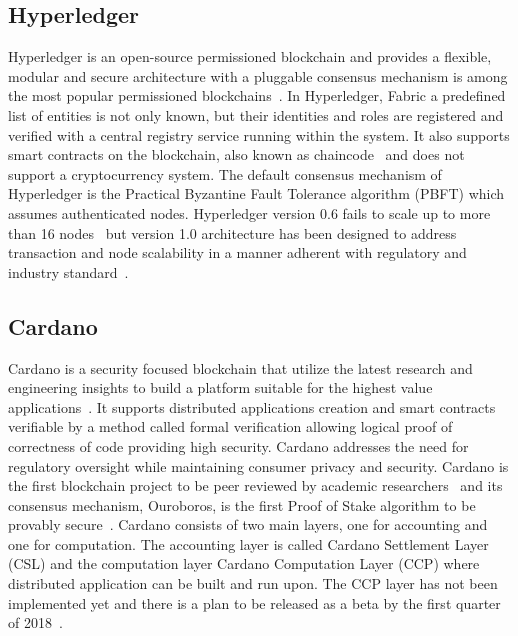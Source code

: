 \subsection{Hyperledger}\label{bltech:impl:hyperledger}

Hyperledger is an open-source permissioned blockchain and provides a flexible, modular and secure architecture with a
pluggable consensus mechanism is among the most popular permissioned blockchains~\cite{DBLP:journals/corr/abs-1708-05665}. In Hyperledger, Fabric a predefined list of
entities is not only known, but their identities and roles are registered and verified with a central registry service running within the system.
It also supports smart contracts on the blockchain, also known as chaincode~\cite{bl_consensus} and does not support a cryptocurrency system. The default consensus
mechanism of Hyperledger is the Practical Byzantine Fault Tolerance algorithm (PBFT) which assumes authenticated nodes.
Hyperledger version 0.6 fails to scale up to more than 16 nodes~\cite{DBLP:journals/corr/abs-1708-05665} but version 1.0 architecture has been designed to address transaction and
node scalability in a manner adherent with regulatory and industry standard~\cite{imb_hypeledger_adv}.

\subsection{Cardano}\label{bltech:impl:cardano}

Cardano is a security focused blockchain that utilize the latest research and engineering insights to build a platform suitable for
the highest value applications~\cite{cardano_site}. It supports distributed applications creation and smart contracts verifiable by a method called formal
verification allowing logical proof of correctness of code providing high security. Cardano addresses the need for regulatory oversight while
maintaining consumer privacy and security. Cardano is the first blockchain project to be peer reviewed by academic researchers~\cite{cardano_site} and its consensus
mechanism, Ouroboros, is the first Proof of Stake algorithm to be provably secure~\cite{Kiayias2017}.
Cardano consists of two main layers, one for accounting and one for computation. The accounting layer is called Cardano Settlement Layer (CSL)
and the computation layer Cardano Computation Layer (CCP) where distributed application can be built and run upon. The CCP layer has not been
implemented yet and there is a plan to be released as a beta by the first quarter of 2018~\cite{cardano_parsons}.


